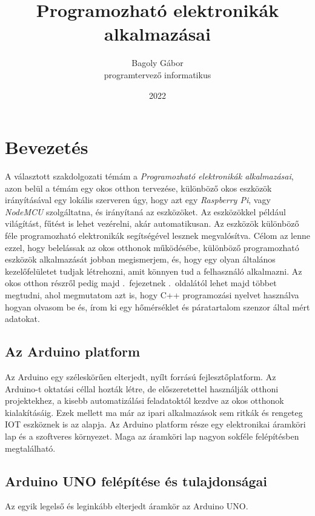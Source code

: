 \documentclass{thesis-ekf}
\theoremstyle{definition}
\begin{document}
\title{Programozható elektronikák alkalmazásai}
\author{Bagoly Gábor\\programtervező informatikus}
\date{2022}
\maketitle
\tableofcontents

\chapter{Bevezetés}\label{ArduinoChapter}

A választott szakdolgozati témám a \emph{Programozható elektronikák alkalmazásai}, azon belül a témám egy okos otthon tervezése, különböző okos eszközök irányításával egy lokális szerveren úgy, hogy azt egy \emph{Raspberry Pi}, vagy \emph{NodeMCU} szolgáltatna, és irányítaná az eszközöket.
Az eszközökkel például világítást, fűtést is lehet vezérelni, akár automatikusan. Az eszközök különböző féle programozható elektronikák segítségével lesznek megvalósítva. Célom az lenne ezzel, hogy belelássak az okos otthonok működésébe, különböző programozható eszközök alkalmazását jobban megismerjem, és, hogy egy olyan általános kezelőfelületet tudjak létrehozni, amit könnyen tud a felhasználó alkalmazni. Az okos otthon részről pedig majd .~fejezetnek \pageref{smarthomeChapter}.~oldalától lehet majd többet megtudni, ahol megmutatom azt is, hogy C++ programozási nyelvet használva hogyan olvasom be és, írom ki egy hőmérséklet és páratartalom szenzor által mért adatokat.

\section{Az Arduino platform}
	Az Arduino egy széleskörűen elterjedt, nyílt forrású fejlesztőplatform. Az Arduino-t oktatási céllal hozták létre, de előszeretettel használják otthoni projektekhez, a kisebb automatizálási feladatoktól kezdve az okos otthonok kialakításáig. Ezek mellett ma már az ipari alkalmazások sem ritkák és rengeteg IOT eszköznek is az alapja.
	Az Arduino platform része egy elektronikai áramköri lap és a szoftveres környezet. Maga az áramköri lap nagyon sokféle felépítésben megtalálható.

\section{Arduino UNO felépítése és tulajdonságai}\label{arduinoUnoSection}
Az egyik legelső és leginkább elterjedt áramkör az Arduino UNO.
\end{document}
